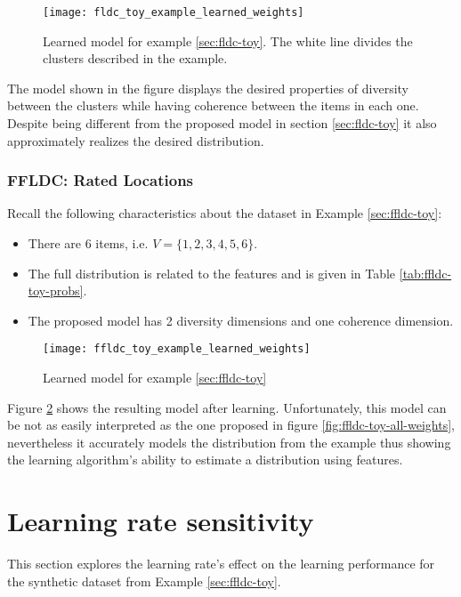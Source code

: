 \begin{figure}
  \centering
  \texttt{[image: fldc\_toy\_example\_learned\_weights]}
  \caption{Learned model for example \ref{sec:fldc-toy}. The white line divides the clusters described in the example.}
  \label{fig:fldc-toy-learned-weights}
\end{figure}

The model shown in the figure displays the desired properties of diversity between the clusters while having coherence between the items in each one. Despite being different from the proposed model in section \ref{sec:fldc-toy} it also approximately realizes the desired distribution.

\subsubsection{FFLDC: Rated Locations}

Recall the following characteristics about the dataset in Example \ref{sec:ffldc-toy}:

\begin{itemize}
  \item There are 6 items, i.e. $V = \{1,2,3,4,5,6\}$.
  \item The full distribution is related to the features and is given in Table \ref{tab:ffldc-toy-probs}.
  \item The proposed model has 2 diversity dimensions and one coherence dimension.
\end{itemize}

\begin{figure}
  \centering
  \texttt{[image: ffldc\_toy\_example\_learned\_weights]}
  \caption{Learned model for example \ref{sec:ffldc-toy}}
  \label{fig:ffldc-toy-learned-weights}
\end{figure}

Figure \ref{fig:ffldc-toy-learned-weights} shows the resulting model after learning. Unfortunately, this model can be not as easily interpreted as the one proposed in figure \ref{fig:ffldc-toy-all-weights}, nevertheless it accurately models the distribution from the example thus showing the learning algorithm's ability to estimate a distribution using features.

\section{Learning rate sensitivity}

This section explores the learning rate's effect on the learning performance for the synthetic dataset from Example \ref{sec:ffldc-toy}.

